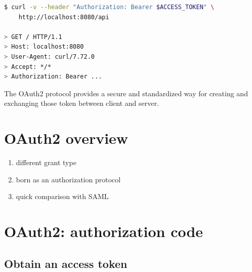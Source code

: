 \documentclass[11pt]{style}
\begin{document}
\begin{lstlisting}[language=bash]
$ curl -v --header "Authorization: Bearer $ACCESS_TOKEN" \
    http://localhost:8080/api

> GET / HTTP/1.1
> Host: localhost:8080
> User-Agent: curl/7.72.0
> Accept: */*
> Authorization: Bearer ...
\end{lstlisting}

The OAuth2 protocol provides a secure and standardized way for creating and exchanging those token between client and server.


\section{OAuth2 overview}
\begin{enumerate}
    \item different grant type
    \item born as an authorization protocol
    \item quick comparison with SAML
\end{enumerate}
\section{OAuth2: authorization code}
\subsection{Obtain an access token}
\end{document}
